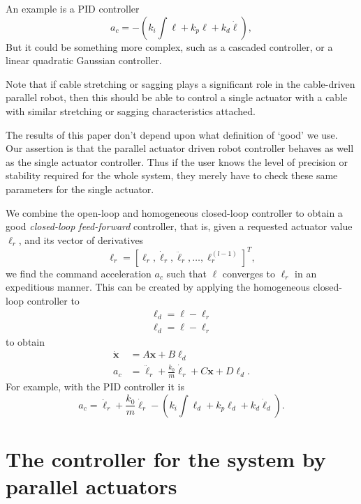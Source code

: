 \documentclass[reqno,twocolumn]{amsart}
\newcommand\tint{{\textstyle\int\!}}
\renewcommand{\mathsf}{}
\begin{document}
An example is a PID controller
\begin{equation}
\label{pid hom closed-loop}
a_c = - (k_i \tint \ell + k_p \ell + k_d \dot \ell),
\end{equation}
But it could be something more complex, such as a cascaded controller, or a linear quadratic Gaussian controller.

Note that if cable stretching or sagging plays a significant role in the cable-driven parallel robot, then this should be able to control a single actuator with a cable with similar stretching or sagging characteristics attached.

The results of this paper don't depend upon what definition of `good' we use.  Our assertion is that the parallel actuator driven robot controller behaves as well as the single actuator controller.  Thus if the user knows the level of precision or stability required for the whole system, they merely have to check these same parameters for the single actuator.

We combine the open-loop and homogeneous closed-loop controller to obtain a good \emph{closed-loop feed-forward} controller, that is, given a requested actuator value $\ell_r$, and its vector of derivatives
\begin{equation}
\bm \ell_r = [\ell_r, \dot \ell_r, \ddot \ell_r, \dots, \ell_r^{(l-1)}]^T ,
\end{equation}
we find the command acceleration $a_c$ such that $\ell$ converges to $\ell_r$ in an expeditious manner.  This can be created by applying the homogeneous closed-loop controller to
\begin{gather}
\label{y_d}
\ell_d = \ell - \ell_r\\
\label{y_d b}
\bm \ell_d = \bm \ell - \bm \ell_r
\end{gather}
to obtain
\begin{align}
\label{closed-loop feed-forward}
\dot {\bm x} &= \mathsf A \bm x + \mathsf B \ell_d \\
\label{closed-loop feed-forward 2}
a_c &= \ddot \ell_r + \frac{k_0}m \dot \ell_r + \mathsf C \bm x + \mathsf D \bm \ell_d.
\end{align}
For example, with the PID controller it is
\begin{equation}
\label{pid closed-loop feed-forward}
a_c = \ddot \ell_r + \frac{k_0}m \dot \ell_r - (k_i \tint \ell_d + k_p \ell_d + k_d \dot \ell_d).
\end{equation}

\section{The controller for the system by parallel actuators}
\label{sec parallel}
\end{document}
